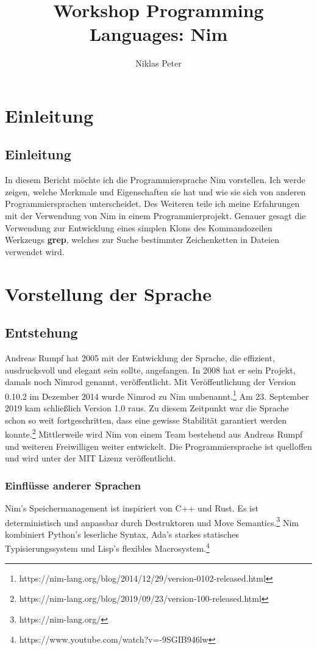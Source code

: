 \documentclass[11pt]{report}
\title{\textbf{Workshop Programming Languages: Nim}}
\author{Niklas Peter}
\date{}
\begin{document}
\maketitle
\tableofcontents


\chapter{Einleitung}
\section{Einleitung}
In diesem Bericht möchte ich die Programmiersprache Nim vorstellen. Ich werde zeigen, welche Merkmale und Eigenschaften sie hat und wie sie sich von anderen Programmiersprachen unterscheidet. Des Weiteren teile ich meine Erfahrungen mit der Verwendung von Nim in einem Programmierprojekt. Genauer gesagt die Verwendung zur Entwicklung eines simplen Klons des Kommandozeilen Werkzeugs \textbf{grep}, welches zur Suche bestimmter Zeichenketten in Dateien verwendet wird.



\chapter{Vorstellung der Sprache}

\section{Entstehung}
Andreas Rumpf hat 2005 mit der Entwicklung der Sprache, die effizient, ausdrucksvoll und elegant sein sollte, angefangen. In 2008 hat er sein Projekt, damals noch Nimrod genannt, veröffentlicht. Mit Veröffentlichung der Version 0.10.2 im Dezember 2014 wurde Nimrod zu Nim umbenannt.\footnote{https://nim-lang.org/blog/2014/12/29/version-0102-released.html} Am 23. September 2019 kam schließlich Version 1.0 raus. Zu diesem Zeitpunkt war die Sprache schon so weit fortgeschritten, dass eine gewisse Stabilität garantiert werden konnte.\footnote{https://nim-lang.org/blog/2019/09/23/version-100-released.html} Mittlerweile wird Nim von einem Team bestehend aus Andreas Rumpf und weiteren Freiwilligen weiter entwickelt. Die Programmiersprache ist quelloffen und wird unter der MIT Lizenz veröffentlicht.

\subsection{Einflüsse anderer Sprachen}
Nim's Speichermanagement ist inspiriert von C++ und Rust. Es ist deterministisch und anpassbar durch Destruktoren und Move Semantics.\footnote{https://nim-lang.org/}
\newline
Nim kombiniert Python's leserliche Syntax, Ada's starkes statisches Typisierungssystem und Lisp's flexibles Macrosystem.\footnote{https://www.youtube.com/watch?v=-9SGIB946lw}
\end{document}
